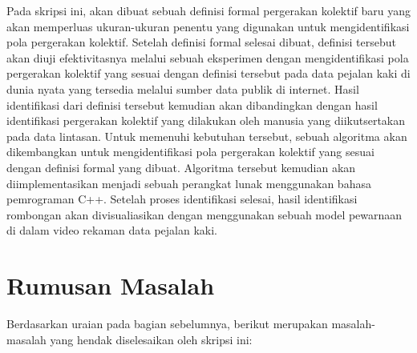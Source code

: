 Pada skripsi ini, akan dibuat sebuah definisi formal pergerakan kolektif baru yang akan memperluas ukuran-ukuran penentu yang digunakan untuk mengidentifikasi pola pergerakan kolektif. Setelah definisi formal selesai dibuat, definisi tersebut akan diuji efektivitasnya melalui sebuah eksperimen dengan mengidentifikasi pola pergerakan kolektif yang sesuai dengan definisi tersebut pada data pejalan kaki di dunia nyata yang tersedia melalui sumber data publik di internet. Hasil identifikasi dari definisi tersebut kemudian akan dibandingkan dengan hasil identifikasi pergerakan kolektif yang dilakukan oleh manusia yang diikutsertakan pada data lintasan. Untuk memenuhi kebutuhan tersebut, sebuah algoritma akan dikembangkan untuk mengidentifikasi pola pergerakan kolektif yang sesuai dengan definisi formal yang dibuat. Algoritma tersebut kemudian akan diimplementasikan menjadi sebuah perangkat lunak menggunakan bahasa pemrograman C++. Setelah proses identifikasi selesai, hasil identifikasi rombongan akan divisualiasikan dengan menggunakan sebuah model pewarnaan di dalam video rekaman data pejalan kaki.

\iffalse

\lionov{tambahin bahwa setelah itu akan dilakukan eksperimen dengan data nyata lintasan yang tersedia di internet (lihat bab 5 di thesis) dan akan dibandingkan hasilnya dengan hasil dari eksperimen sebelumnya (jangna lupa jelasin bahwa di eksperimen sebelumnya, yang dibandingkan itu cuma grup, gak ngebandingin tempat dan waktu). Terus harus disinggung bahwa di data eksperimen itu, udah ada grup yang ditentukan oleh manusia, jadi nanti hasil program akan dibandingkan dengan kunci jawabannya.} \cristopher{Di atas kan udah saya sebuat kalo identifikasinya akan diuji dengan dibandingkan, kalo gitu kudu rephrase atau biarin ajah ko?}

\fi

\section{Rumusan Masalah}
\label{sec:rumusan}

Berdasarkan uraian pada bagian sebelumnya, berikut merupakan masalah-masalah yang hendak diselesaikan oleh skripsi ini:
\iffalse


